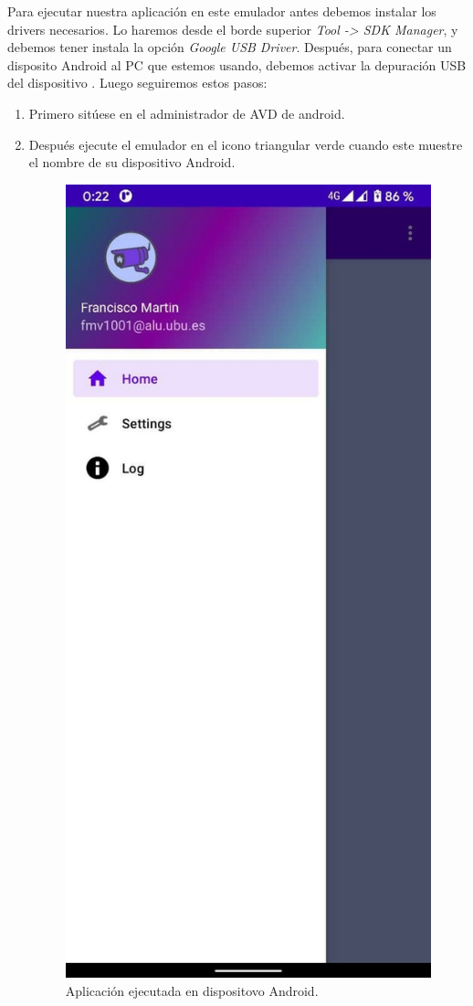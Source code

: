 Para ejecutar nuestra aplicación en este emulador antes debemos instalar los drivers necesarios. Lo haremos desde el borde superior \textit{Tool -> SDK Manager}, y debemos tener instala la opción \textit{Google USB Driver}.
Después, para conectar un disposito Android al PC que estemos usando, debemos activar la depuración USB del dispositivo \cite{andusbdebug}.
Luego seguiremos estos pasos:
\begin{enumerate}
\item
	Primero sitúese en el administrador de AVD de android.
\item
	Después ejecute el emulador en el icono triangular verde cuando este muestre el nombre de su dispositivo Android.
\begin{figure}[h!]
	\centering
	\includegraphics[width=0.35\linewidth]{img/appdevice}
	\caption{Aplicación ejecutada en dispositovo Android.}
	\label{fig:androapp}
\end{figure}
\end{enumerate}

